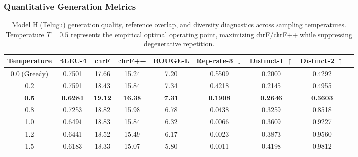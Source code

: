 \documentclass[8pt]{article}
\begin{document}
\subsubsection{Quantitative Generation Metrics}
\begin{table}[H]
    \centering
    \small
    \setlength{\tabcolsep}{4.8pt}
    \begin{tabular}{ccccccccc}
        \toprule
        \textbf{Temperature} & \textbf{BLEU-4} & \textbf{chrF} & \textbf{chrF++} & \textbf{ROUGE-L} & \textbf{Rep-rate-3} $\downarrow$ & \textbf{Distinct-1} $\uparrow$ & \textbf{Distinct-2} $\uparrow$ \\
        \midrule
        0.0 (Greedy) & 0.7501 & 17.66 & 15.24 & 7.20 & 0.5509 & 0.2000 & 0.4292 \\
        0.2 & 0.7591 & 18.43 & 15.84 & 7.34 & 0.4218 & 0.2145 & 0.4955 \\
        \textbf{0.5} & \textbf{0.6284} & \textbf{19.12} & \textbf{16.38} & \textbf{7.31} & \textbf{0.1908} & \textbf{0.2646} & \textbf{0.6603} \\
        0.8 & 0.7253 & 18.82 & 15.98 & 6.78 & 0.0438 & 0.3259 & 0.8518 \\
        1.0 & 0.6494 & 18.83 & 15.84 & 6.32 & 0.0066 & 0.3609 & 0.9227 \\
        1.2 & 0.6441 & 18.52 & 15.49 & 6.17 & 0.0023 & 0.3873 & 0.9560 \\
        1.5 & 0.6183 & 18.33 & 15.07 & 5.80 & 0.0011 & 0.4198 & 0.9812 \\
        \bottomrule
    \end{tabular}
    \caption{Model H (Telugu) generation quality, reference overlap, and diversity diagnostics across sampling temperatures. Temperature $T = 0.5$ represents the empirical optimal operating point, maximizing chrF/chrF++ while suppressing degenerative repetition.}
    \label{tab:generation_model_H}
\end{table}
\end{document}

